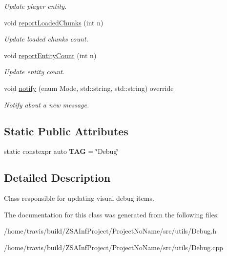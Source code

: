 \begin{DoxyCompactItemize}
\begin{DoxyCompactList}\small\item\em Update player entity. \end{DoxyCompactList}\item 
\hypertarget{classDebug_afc1e08fb844555f357b5f102a3b0a554}{void \hyperlink{classDebug_afc1e08fb844555f357b5f102a3b0a554}{report\-Loaded\-Chunks} (int n)}\label{classDebug_afc1e08fb844555f357b5f102a3b0a554}

\begin{DoxyCompactList}\small\item\em Update loaded chunks count. \end{DoxyCompactList}\item 
\hypertarget{classDebug_a36ded885c182f5154687c20d862fd806}{void \hyperlink{classDebug_a36ded885c182f5154687c20d862fd806}{report\-Entity\-Count} (int n)}\label{classDebug_a36ded885c182f5154687c20d862fd806}

\begin{DoxyCompactList}\small\item\em Update entity count. \end{DoxyCompactList}\item 
\hypertarget{classDebug_a615e0ffabb0e20061ae0bce633f12f63}{void \hyperlink{classDebug_a615e0ffabb0e20061ae0bce633f12f63}{notify} (enum Mode, std\-::string, std\-::string) override}\label{classDebug_a615e0ffabb0e20061ae0bce633f12f63}

\begin{DoxyCompactList}\small\item\em Notify about a new message. \end{DoxyCompactList}\end{DoxyCompactItemize}
\subsection*{Static Public Attributes}
\begin{DoxyCompactItemize}
\item 
\hypertarget{classDebug_a5187dfbf2cbea776270132c27cda656c}{static constexpr auto {\bfseries T\-A\-G} = \char`\"{}Debug\char`\"{}}\label{classDebug_a5187dfbf2cbea776270132c27cda656c}

\end{DoxyCompactItemize}


\subsection{Detailed Description}
Class responsible for updating visual debug items. 

The documentation for this class was generated from the following files\-:\begin{DoxyCompactItemize}
\item 
/home/travis/build/\-Z\-S\-A\-Inf\-Project/\-Project\-No\-Name/src/utils/Debug.\-h\item 
/home/travis/build/\-Z\-S\-A\-Inf\-Project/\-Project\-No\-Name/src/utils/Debug.\-cpp\end{DoxyCompactItemize}
